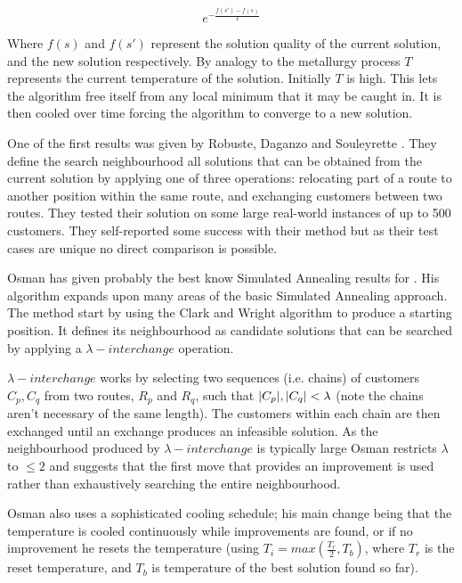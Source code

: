 \[
e^{-\frac{f(s')-f(s)}{T}}
\]

Where $f(s)$ and $f(s')$ represent the solution quality of the current solution, and the new solution respectively. By analogy to the metallurgy process $T$ represents the current temperature of the solution. Initially $T$ is high. This lets the algorithm free itself from any local minimum that it may be caught in. It is then cooled over time forcing the algorithm to converge to a new solution. 

One of the first results was given by Robuste, Daganzo and Souleyrette \cite{RDS:1990}. They define the search neighbourhood all solutions that can be obtained from the current solution by applying one of three operations: relocating part of a route to another position within the same route, and exchanging customers between two routes. They tested their solution on some large real-world instances of up to 500 customers. They self-reported some success with their method but as their test cases are unique no direct comparison is possible. 

Osman has given probably the best know Simulated Annealing results for \VRP \cite{Osman:1993}. His algorithm expands upon many areas of the basic Simulated Annealing approach. The method start by using the Clark and Wright algorithm to produce a starting position. It defines its neighbourhood as candidate solutions that can be searched by applying a $\lambda-interchange$ operation.

$\lambda-interchange$ works by selecting two sequences (i.e. chains) of customers $C_p, C_q$ from two routes, $R_p$ and $R_q$, such that $|C_p|, |C_q| < \lambda$ (note the chains aren't necessary of the same length). The customers within each chain are then exchanged until an exchange produces an infeasible solution. As the neighbourhood produced by $\lambda-interchange$ is typically large Osman restricts $\lambda$ to $\le 2$ and suggests that the first move that provides an improvement is used rather than exhaustively searching the entire neighbourhood.


Osman also uses a sophisticated cooling schedule; his main change being that the temperature is cooled continuously while improvements are found, or if no improvement he resets the temperature (using $T_i = max(\frac{T_r}{2}, T_b)$, where $T_r$ is the reset temperature, and $T_b$ is temperature of the best solution found so far). 

